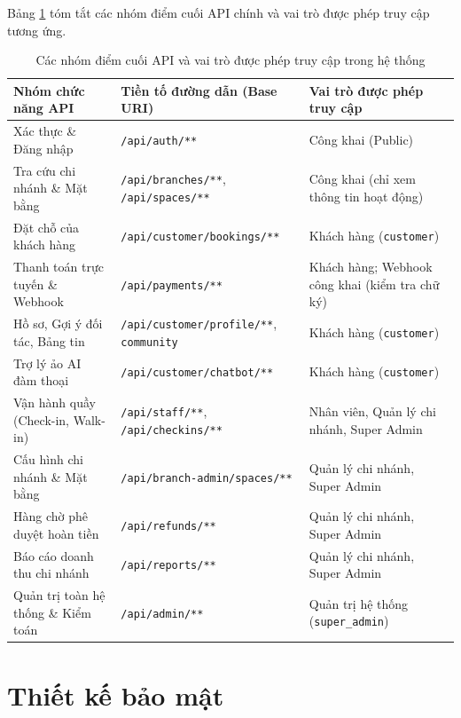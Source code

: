 Bảng \ref{tab:api_nhom} tóm tắt các nhóm điểm cuối API chính và vai trò được phép truy cập tương ứng.

\begin{table}[H]
\centering
\caption{Các nhóm điểm cuối API và vai trò được phép truy cập trong hệ thống}
\label{tab:api_nhom}
\small
\renewcommand{\arraystretch}{1.2}
\begin{tabular}{|p{4.2cm}|p{4.8cm}|p{4.8cm}|}
\hline
\textbf{Nhóm chức năng API} & \textbf{Tiền tố đường dẫn (Base URI)} & \textbf{Vai trò được phép truy cập} \\
\hline
Xác thực \& Đăng nhập & \texttt{/api/auth/**} & Công khai (Public) \\
\hline
Tra cứu chi nhánh \& Mặt bằng & \texttt{/api/branches/**}, \texttt{/api/spaces/**} & Công khai (chỉ xem thông tin hoạt động) \\
\hline
Đặt chỗ của khách hàng & \texttt{/api/customer/bookings/**} & Khách hàng (\texttt{customer}) \\
\hline
Thanh toán trực tuyến \& Webhook & \texttt{/api/payments/**} & Khách hàng; Webhook công khai (kiểm tra chữ ký) \\
\hline
Hồ sơ, Gợi ý đối tác, Bảng tin & \texttt{/api/customer/profile/**}, \texttt{community} & Khách hàng (\texttt{customer}) \\
\hline
Trợ lý ảo AI đàm thoại & \texttt{/api/customer/chatbot/**} & Khách hàng (\texttt{customer}) \\
\hline
Vận hành quầy (Check-in, Walk-in) & \texttt{/api/staff/**}, \texttt{/api/checkins/**} & Nhân viên, Quản lý chi nhánh, Super Admin \\
\hline
Cấu hình chi nhánh \& Mặt bằng & \texttt{/api/branch-admin/spaces/**} & Quản lý chi nhánh, Super Admin \\
\hline
Hàng chờ phê duyệt hoàn tiền & \texttt{/api/refunds/**} & Quản lý chi nhánh, Super Admin \\
\hline
Báo cáo doanh thu chi nhánh & \texttt{/api/reports/**} & Quản lý chi nhánh, Super Admin \\
\hline
Quản trị toàn hệ thống \& Kiểm toán & \texttt{/api/admin/**} & Quản trị hệ thống (\texttt{super\_admin}) \\
\hline
\end{tabular}
\end{table}

\section{Thiết kế bảo mật}
\label{sec:thietke_baomat}

